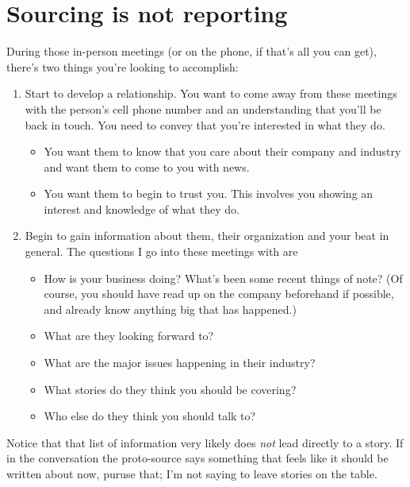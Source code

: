 \documentclass[
  11pt,
  american,
  letterpaperpaper,
  extrafontsizes,onecolumn,openright
  ]{memoir}
\providecommand{\tightlist}{%
  \setlength{\itemsep}{0pt}\setlength{\parskip}{0pt}}
\begin{document}
\hypertarget{sourcing-is-not-reporting}{%
\section*{Sourcing is not reporting}\label{sourcing-is-not-reporting}}

During those in-person meetings (or on the phone, if that's all you can get), there's two things you're looking to accomplish:

\begin{enumerate}
\def\labelenumi{\arabic{enumi}.}
\tightlist
\item
  Start to develop a relationship. You want to come away from these meetings with the person's cell phone number and an understanding that you'll be back in touch. You need to convey that you're interested in what they do.

  \begin{itemize}
  \tightlist
  \item
    You want them to know that you care about their company and industry and want them to come to you with news.
  \item
    You want them to begin to trust you. This involves you showing an interest and knowledge of what they do.
  \end{itemize}
\item
  Begin to gain information about them, their organization and your beat in general. The questions I go into these meetings with are

  \begin{itemize}
  \tightlist
  \item
    How is your business doing? What's been some recent things of note? (Of course, you should have read up on the company beforehand if possible, and already know anything big that has happened.)
  \item
    What are they looking forward to?
  \item
    What are the major issues happening in their industry?
  \item
    What stories do they think you should be covering?
  \item
    Who else do they think you should talk to?
  \end{itemize}
\end{enumerate}

Notice that that list of information very likely does \emph{not} lead directly to a story. If in the conversation the proto-source says something that feels like it should be written about now, puruse that; I'm not saying to leave stories on the table.
\end{document}

